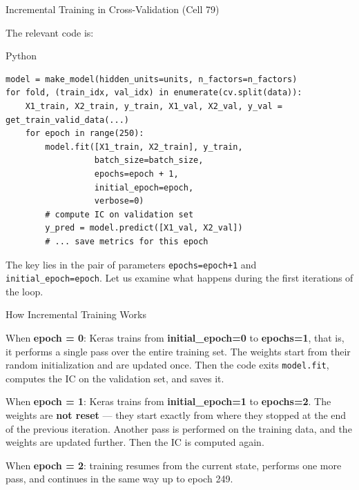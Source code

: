 \documentclass[aspectratio=169, 11pt]{beamer}
\begin{document}
%
%
\begin{frame}[fragile]{Incremental Training in Cross-Validation (Cell 79)}

The relevant code is:

\begin{block}{Python}
\scriptsize
\begin{verbatim}
model = make_model(hidden_units=units, n_factors=n_factors)
for fold, (train_idx, val_idx) in enumerate(cv.split(data)):
    X1_train, X2_train, y_train, X1_val, X2_val, y_val = get_train_valid_data(...)
    for epoch in range(250):
        model.fit([X1_train, X2_train], y_train,
                  batch_size=batch_size,
                  epochs=epoch + 1,
                  initial_epoch=epoch,
                  verbose=0)
        # compute IC on validation set
        y_pred = model.predict([X1_val, X2_val])
        # ... save metrics for this epoch
\end{verbatim}
\end{block}

The key lies in the pair of parameters \texttt{epochs=epoch+1} and \texttt{initial\_epoch=epoch}. Let us examine what happens during the first iterations of the loop.

\end{frame}
%
%
\begin{frame}{How Incremental Training Works}

When \textbf{epoch = 0}: Keras trains from \textbf{initial\_epoch=0} to \textbf{epochs=1}, that is, it performs a single pass over the entire training set. The weights start from their random initialization and are updated once. Then the code exits \texttt{model.fit}, computes the IC on the validation set, and saves it.

\vspace{0.3cm}

When \textbf{epoch = 1}: Keras trains from \textbf{initial\_epoch=1} to \textbf{epochs=2}. The weights are \textbf{not reset} — they start exactly from where they stopped at the end of the previous iteration. Another pass is performed on the training data, and the weights are updated further. Then the IC is computed again.

\vspace{0.3cm}

When \textbf{epoch = 2}: training resumes from the current state, performs one more pass, and continues in the same way up to epoch 249.

\end{frame}
\end{document}

